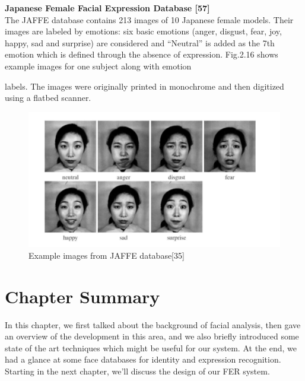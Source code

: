\documentclass[12pt, twoside]{report}
\begin{document}
	\noindent \textbf{Japanese Female Facial Expression Database [57]}
	\vspace{0.3cm} \\
	The JAFFE database contains 213 images of 10 Japanese female models. Their images are labeled by emotions: six basic emotions (anger, disgust, fear, joy, happy, sad and surprise) are considered and “Neutral” is added as the 7th emotion which is defined through the absence of expression. Fig.2.16 shows example images for one subject along with emotion

	\newpage
	
	\begin{table}
		\caption{Commonly used expression recognition databases [35] }
  		\centering
	\end{table}

	labels. The images were originally printed in monochrome and then digitized using a flatbed scanner.
	
	\begin{figure}
		\includegraphics[width=\textwidth]{img/94_1.jpg}
		\caption{Example images from JAFFE database[35]}
		\label{Fig 2.16}
	\end{figure}
	\section{Chapter Summary}
	\par
	In this chapter, we first talked about the background of facial analysis, then gave an overview of the development in this area, and we also briefly introduced some state of the art techniques which might be useful for our system. At the end, we had a glance at some face databases for identity and expression recognition. Starting in the next chapter, we'll discuss the design of our FER system.
	
\end{document}

